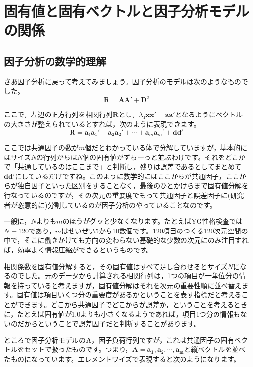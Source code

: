 \documentclass{ltjsbook}
\begin{document}
\chapter{固有値と固有ベクトルと因子分析モデルの関係}
\label{x08_eigen}



\section{因子分析の数学的理解}
さあ因子分析に戻って考えてみましょう。因子分析のモデルは次のようなものでした。
\begin{equation}
    \bm{R} = \bm{A} \bm{A} ' + \bm{D}^2
\end{equation}

ここで，左辺の正方行列を相関行列$\bm{R}$とし，$\lambda_1 \bm{xx'} = \bm{aa'}$となるようにベクトルの大きさが整えられているとすれば，次のように表現できます。
\begin{equation}
    \bm{R}=\bm{a}_1\bm{a}_1'+\bm{a}_2\bm{a}_2'+\cdots +\bm{a}_m\bm{a}_m'+\bm{d} \bm{d}'
\end{equation}

ここでは共通因子の数が$m$個だとわかっている体で分解していますが，基本的にはサイズ$N$の行列からは$N$個の固有値がずらーっと並ぶわけです。それをどこかで「共通しているのはここまで」と判断し，残りは誤差であるとしてまとめて$\bm{dd'}$にしているだけですね。このように数学的にはここからが共通因子，ここからが独自因子といった区別をすることなく，最後のひとかけらまで固有値分解を行なっているのですが，その次元の重要度でもって共通因子と誤差因子に(研究者が恣意的に)分割しているのが因子分析のやっていることなのです。

一般に，$N$よりも$m$のほうがグッと少なくなります。たとえばYG性格検査では$N=120$であり，$m$はせいぜい5から10数個です。120項目のつくる120次元空間の中で，そこに働きかけても方向の変わらない基礎的な少数の次元にのみ注目すれば，効率よく情報圧縮ができるというものです。

相関係数を固有値分解すると，その固有値はすべて足し合わせるとサイズ$N$になるのでした。元のデータから計算される相関行列は，1つの項目が一単位分の情報を持っていると考えますが，固有値分解はそれを次元の重要性順に並べ替えます。固有値は項目いくつ分の重要度があるかということを表す指標だと考えることができます。どこから共通因子でどこからが誤差か，ということを考えるときに，たとえば固有値が1.0よりも小さくなるようであれば，項目1つ分の情報もないのだからということで誤差因子だと判断することがあります。

ところで因子分析モデルの$\bm{A}$，因子負荷行列ですが，これは共通因子の固有ベクトルをセットで扱ったものです。つまり，$\bm{A} = \bm{a_1,a_2,\cdots,a_m}$と縦ベクトルを並べたものになっています。エレメントワイズで表現すると次のようになります。
\end{document}
